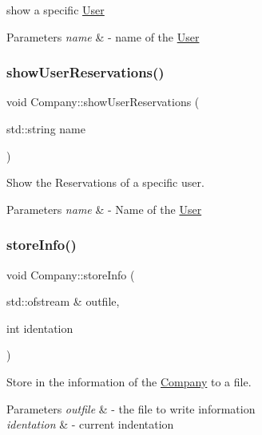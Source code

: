 show a specific \mbox{\hyperlink{class_user}{User}} 


\begin{DoxyParams}{Parameters}
{\em name} & -\/ name of the \mbox{\hyperlink{class_user}{User}} \\
\hline
\end{DoxyParams}
\mbox{\label{class_company_a428b70dbf9acd5edb34ee131ff1f8613}} 
\subsubsection{\texorpdfstring{show\+User\+Reservations()}{showUserReservations()}}
{\footnotesize\ttfamily void Company\+::show\+User\+Reservations (\begin{DoxyParamCaption}\item[{std\+::string}]{name }\end{DoxyParamCaption})}



Show the Reservations of a specific user. 


\begin{DoxyParams}{Parameters}
{\em name} & -\/ Name of the \mbox{\hyperlink{class_user}{User}} \\
\hline
\end{DoxyParams}
\mbox{\label{class_company_ac03f62f1accf21eb445a7aa5731b1199}} 
\subsubsection{\texorpdfstring{store\+Info()}{storeInfo()}}
{\footnotesize\ttfamily void Company\+::store\+Info (\begin{DoxyParamCaption}\item[{std\+::ofstream \&}]{outfile,  }\item[{int}]{identation }\end{DoxyParamCaption})}



Store in the information of the \mbox{\hyperlink{class_company}{Company}} to a file. 


\begin{DoxyParams}{Parameters}
{\em outfile} & -\/ the file to write information \\
\hline
{\em identation} & -\/ current indentation \\
\hline
\end{DoxyParams}
\mbox{\label{class_company_a64817eefb5be8a9d23af9e0f651b7f71}} 
